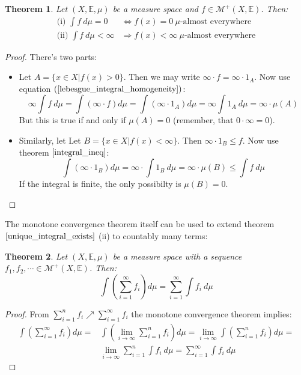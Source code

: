 \documentclass[12pt, a4paper]{article}
\newtheorem{theorem}{Theorem}[section]
\numberwithin{equation}{section}
\begin{document}
\begin{theorem}
\label{zero_infty_ae}
Let $(X,\mathbb{E},\mu)$ be a measure space and $f\in\mathcal{M}^+(X,\mathbb{E})$. Then:
\begin{align}
\textrm{(i) }\int f\ d\mu =0&\Leftrightarrow f(x)=0\ \mu\textrm{-almost everywhere} \\
\textrm{(ii) }\int f\ d\mu <\infty&\Rightarrow f(x)<\infty\ \mu\textrm{-almost everywhere}
\end{align}
\end{theorem}
\begin{proof}
There's two parts:
\begin{itemize}
\item Let $A=\{x\in X|f(x)>0\}$. Then we may write $\infty\cdot f=\infty\cdot 1_A$. Now use equation $(\ref{lebesgue_integral_homogeneity})$:
\begin{equation}
\infty\int f\ d\mu=\int(\infty\cdot f)d\mu=\int(\infty\cdot 1_A)d\mu=\infty\int 1_A\ d\mu=\infty\cdot\mu(A)
\end{equation}
But this is true if and only if $\mu(A)=0$ (remember, that $0\cdot\infty=0$).
\item Similarly, let Let $B=\{x\in X|f(x)<\infty\}$. Then $\infty\cdot 1_B\le f$. Now use theorem $\ref{integral_ineq}$:
\begin{equation}
\int(\infty\cdot 1_B)d\mu=\infty\cdot\int 1_B\ d\mu=\infty\cdot\mu(B)\le\int f\ d\mu
\end{equation}
If the integral is finite, the only possibilty is $\mu(B)=0$.
\end{itemize}
\end{proof}

The monotone convergence theorem itself can be used to extend theorem $\ref{unique_integral_exists}$ (ii) to countably many terms:

\begin{theorem}
\label{exchange_int_sum}
Let $(X,\mathbb{E},\mu)$ be a measure space with a sequence $f_1,f_2,\cdots\in\mathcal{M}^+(X,\mathbb{E})$. Then:
\begin{equation}
\int\left(\sum_{i=1}^\infty f_i\right)d\mu=\sum_{i=1}^\infty\int f_i\ d\mu
\end{equation}
\end{theorem}
\begin{proof}
From $\sum_{i=1}^n f_i\nearrow\sum_{i=1}^\infty f_i$ the monotone convergence theorem implies:
\begin{align}
\int\left(\sum_{i=1}^\infty f_i\right)d\mu=&\int\left(\underset{i\rightarrow\infty}{\lim}\sum_{i=1}^n f_i\right)d\mu=\underset{i\rightarrow\infty}{\lim}\int\left(\sum_{i=1}^n f_i\right)d\mu=\\
&\underset{i\rightarrow\infty}{\lim}\sum_{i=1}^n\int f_i\ d\mu=\sum_{i=1}^\infty\int f_i\ d\mu
\end{align}
\end{proof}
\end{document}
